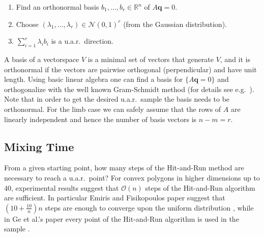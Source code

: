 \begin{enumerate}
\item
Find an orthonormal basis $b_1, \dots, b_r \in \mathbb{R}^{n}$ of $A\textbf{q} =0$.
\item
Choose $(\lambda_1, \dots, \lambda_r) \in \mathcal{N}(0,1)^r$ (from the Gaussian distribution).
\item
$\sum_{i=1}^r \lambda_i b_i$ is a u.a.r.\ direction.
\end{enumerate}

A basis of a vectorspace $V$ is a minimal set of vectors that generate $V$, and it is orthonormal if the vectors are pairwise orthogonal (perpendicular) and have unit length. Using basic linear algebra one can find a basis for $\{A\textbf{q} = 0\}$ and orthogonalize with the well known Gram-Schmidt method (for details see e.g.\ \cite{Robertson}). Note that in order to get the desired u.a.r.\ sample the basis needs to be orthonormal. For the limb case we can safely assume that the rows of $A$ are linearly independent and hence the number of basis vectors is $n-m = r$.



\subsection{Mixing Time}
\label{sec_lengthrun}
From a given starting point, how many steps of the Hit-and-Run method are necessary to reach a u.a.r.\ point? For convex polygons in higher dimensions up to $40$, experimental results suggest that $\mathcal{O}(n)$ steps of the Hit-and-Run algorithm are sufficient.
In particular Emiris and Fisikopoulos paper suggest that $(10 + \frac{10}{n})n$ steps are enough to converge upon the uniform distribution \cite{emiris2013efficient}, while in Ge et al.'s paper every point of the Hit-and-Run algorithm is used in the sample \cite{Ge}. 


